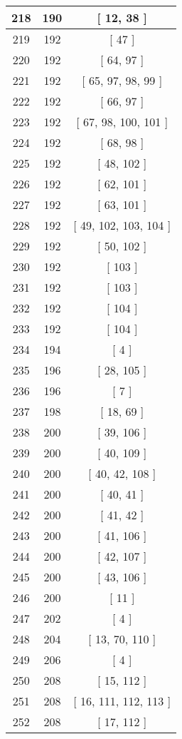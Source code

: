 \begin{center}
\begin{longtable}[H]{|| c c c ||}
\hline
218 & 190 & [ 12, 38 ] \\ 
\hline
219 & 192 & [ 47 ] \\ 
\hline
220 & 192 & [ 64, 97 ] \\ 
\hline
221 & 192 & [ 65, 97, 98, 99 ] \\ 
\hline
222 & 192 & [ 66, 97 ] \\ 
\hline
223 & 192 & [ 67, 98, 100, 101 ] \\ 
\hline
224 & 192 & [ 68, 98 ] \\ 
\hline
225 & 192 & [ 48, 102 ] \\ 
\hline
226 & 192 & [ 62, 101 ] \\ 
\hline
227 & 192 & [ 63, 101 ] \\ 
\hline
228 & 192 & [ 49, 102, 103, 104 ] \\ 
\hline
229 & 192 & [ 50, 102 ] \\ 
\hline
230 & 192 & [ 103 ] \\ 
\hline
231 & 192 & [ 103 ] \\ 
\hline
232 & 192 & [ 104 ] \\ 
\hline
233 & 192 & [ 104 ] \\ 
\hline
234 & 194 & [ 4 ] \\ 
\hline
235 & 196 & [ 28, 105 ] \\ 
\hline
236 & 196 & [ 7 ] \\ 
\hline
237 & 198 & [ 18, 69 ] \\ 
\hline
238 & 200 & [ 39, 106 ] \\ 
\hline
239 & 200 & [ 40, 109 ] \\ 
\hline
240 & 200 & [ 40, 42, 108 ] \\ 
\hline
241 & 200 & [ 40, 41 ] \\ 
\hline
242 & 200 & [ 41, 42 ] \\ 
\hline
243 & 200 & [ 41, 106 ] \\ 
\hline
244 & 200 & [ 42, 107 ] \\ 
\hline
245 & 200 & [ 43, 106 ] \\ 
\hline
246 & 200 & [ 11 ] \\ 
\hline
247 & 202 & [ 4 ] \\ 
\hline
248 & 204 & [ 13, 70, 110 ] \\ 
\hline
249 & 206 & [ 4 ] \\ 
\hline
250 & 208 & [ 15, 112 ] \\ 
\hline
251 & 208 & [ 16, 111, 112, 113 ] \\ 
\hline
252 & 208 & [ 17, 112 ] \\ 

\end{longtable}
\end{center}
